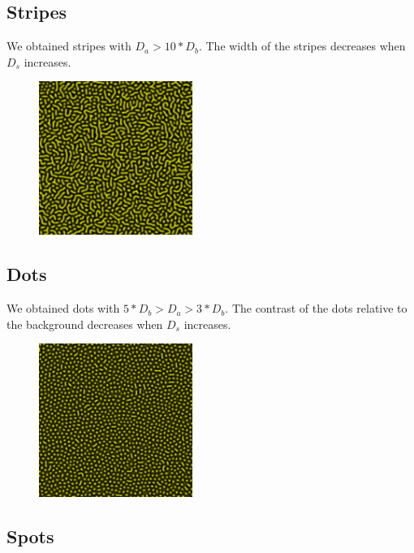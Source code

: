 \documentclass[a4paper,11pt]{article}
\begin{document}
\subsection{Stripes} %
\label{sub:stripes}

We obtained stripes with $D_a > 10 * D_b$. The width of the stripes decreases when $D_s$ increases.

\begin{figure}[!ht]
  \centering
  \includegraphics[width=5cm]{img/stripes.png}
\end{figure}


\subsection{Dots} %
\label{sub:dots}

We obtained dots with $5 * D_b > D_a > 3 * D_b$. The contrast of the dots
relative to the background decreases when $D_s$ increases.

\begin{figure}[!ht]
  \centering
  \includegraphics[width=5cm]{img/dots.png}
\end{figure}


\subsection{Spots} %
\label{sub:spots}
\end{document}
